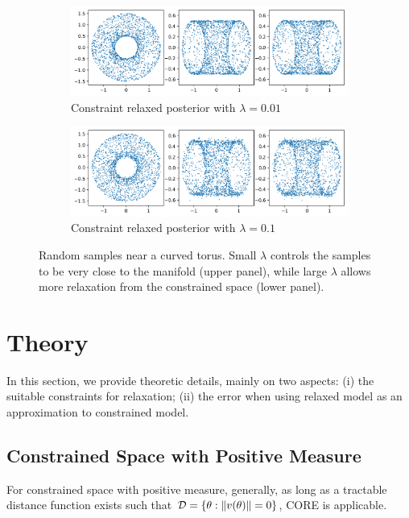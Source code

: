 \documentclass[10pt,fleqn]{article}
\DeclareMathOperator{\1}{\mathbbm{1}} \DeclareMathOperator{\bigO}{\mc O}
\begin{document}
\begin{figure}[H]
\begin{subfigure}[b]{1\textwidth}
 \includegraphics[width=1\textwidth]{torus_001.png}
 \caption{Constraint relaxed posterior with $\lambda
 = 0.01$}
\end{subfigure}
\begin{subfigure}[b]{1\textwidth}
 \includegraphics[width=1\textwidth]{torus_005.png}
 \caption{Constraint relaxed posterior with $\lambda
 = 0.1$}
\end{subfigure}
 \caption{Random samples near a curved torus. Small $\lambda$ controls the samples to be very close to the manifold (upper panel), while large $\lambda$ allows more  relaxation from the constrained space (lower panel).
 \label{fig:torus}}
\end{figure}




\section{Theory}

In this section, we provide theoretic details, mainly on two aspects: (i)
the suitable constraints for relaxation; (ii) the error when using relaxed
model as an approximation to constrained model.

\subsection{Constrained
Space with Positive Measure } \label{SEC:Positive_measure_theory}

For constrained space with positive measure, generally, as long
as a tractable distance function exists such that $\mathcal{D}=\{\theta:
\|v(\theta)\|=0\}$, CORE is applicable.
\end{document}
